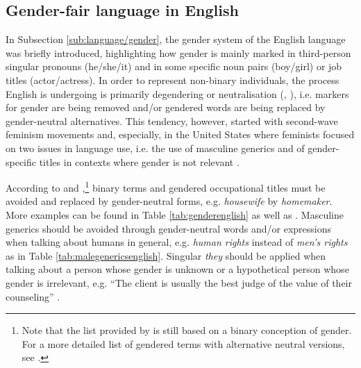 \subsection{Gender-fair language in English}
In Subsection \ref{sub:language/gender}, the gender system of the English language was briefly introduced, highlighting how gender is mainly marked in third-person singular pronouns (he/she/it) and in some specific noun pairs (boy/girl) or job titles (actor/actress). In order to represent non-binary individuals, the process English is undergoing is primarily degendering or neutralisation (\cite[17]{weatherall2002gender}, \cite{sczesny2016can}), i.e. markers for gender are being removed and/or gendered words are being replaced by gender-neutral alternatives. This tendency, however, started with second-wave feminism movements and, especially, in the United States where feminists focused on two issues in language use, i.e. the use of masculine generics and of gender-specific titles in contexts where gender is not relevant \citep[73]{kramer2016feminist}.

According to \textcite{apagenderenglish} and \textcite{europarlenglish},\footnote{Note that the list provided by \textcite{europarlenglish} is still based on a binary conception of gender. For a more detailed list of gendered terms with alternative neutral versions, see \textcite{nonbinarywikienglish}.} binary terms and gendered occupational titles must be avoided and replaced by gender-neutral forms, e.g. \textit{housewife} by \textit{homemaker}. More examples can be found in Table \ref{tab:genderenglish} as well as \textcite{apagenderenglish}. Masculine generics should be avoided through gender-neutral words and/or expressions when talking about humans in general, e.g. \textit{human rights} instead of \textit{men's rights} \citep{apagenderenglish} as in Table \ref{tab:malegenericsenglish}. Singular \textit{they} should be applied when talking about a person whose gender is unknown or a hypothetical person whose gender is irrelevant, e.g. ``The client is usually the best judge of the value of their counseling'' \citep{apagenderenglish}. 

